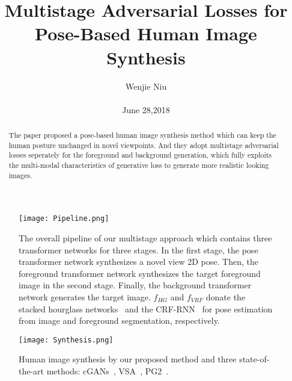\documentclass[10pt,twocolumn,letterpaper]{article}
\begin{document}
\title{Multistage Adversarial Losses for Pose-Based Human Image Synthesis}

\author{Wenjie Niu\\\\ June 28,2018}

\maketitle

\begin{abstract}
The paper proposed a pose-based human image synthesis method which can keep the human posture unchanged in novel viewpoints. And they adopt multistage adversarial losses seperately for the foreground and background generation, which fully exploits the multi-modal characteristics of generative loss to generate more realistic looking images.\par
\end{abstract}

\begin{figure*}
\begin{center}
   \texttt{[image: Pipeline.png]}
\end{center}
   \caption{The overall pipeline of our multistage approach which contains three transformer networks for three stages. In the first stage, the pose transformer network synthesizes a novel view 2D pose. Then, the foreground transformer network synthesizes the target foreground image in the second stage. Finally, the background transformer network generates the target image. $f_{HG}$ and $ f_{VRF}$ donate the stacked hourglass networks~\cite{Newell2016Stacked} and the CRF-RNN~\cite{Zheng2016Conditional} for pose estimation from image and foreground segmentation, respectively.\cite{Si_2018_CVPR}}
\label{fig:Pipeline}
\end{figure*}

\begin{figure}[H]
\begin{center}
   \texttt{[image: Synthesis.png]}
\end{center}
   \caption{Human image synthesis by our proposed method and three state-of-the-art methods: cGANs~\cite{MirzaO14}, VSA~\cite{Ruben_2017_Lea}, PG2~\cite{MaJSSTG17}.~\cite{Si_2018_CVPR}}
\label{fig:Synthesis}
\end{figure}

\end{document}
